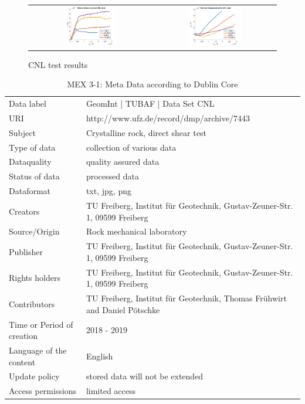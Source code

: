 \begin{figure}[!ht]
\begin{tabular}{cc}
\includegraphics[width=0.45\textwidth]{./figures/CNLShearCurvesAll.png}     
& 
\includegraphics[width=0.45\textwidth]{./figures/CNLDilatationAll.png} 
\end{tabular}
\caption{CNL test results}
\label{fig:DataCNLGraniteLab}
\end{figure}

\begin{table}[!ht]
\caption{MEX 3-1: Meta Data according to Dublin Core}
\label{tab:dms-mex3-1}
\small
\begin{tabular}{R{3cm}|L{7cm}}
\hline
%
Data label & GeomInt | TUBAF | Data Set CNL \\
URI & http://www.ufz.de/record/dmp/archive/7443 \\
Subject  & Crystalline rock, direct shear test \\
Type of data  & collection of various data \\
Dataquality  & quality assured data \\
Status of data  & processed data \\
Dataformat  & txt, jpg, png \\
Creators  & TU Freiberg, Institut für Geotechnik, Gustav-Zeuner-Str. 1, 09599 Freiberg \\
Source/Origin  & Rock mechanical laboratory \\
Publisher  & TU Freiberg, Institut für Geotechnik, Gustav-Zeuner-Str. 1, 09599 Freiberg \\
Rights holders  & TU Freiberg, Institut für Geotechnik, Gustav-Zeuner-Str. 1, 09599 Freiberg \\
Contributors  & TU Freiberg, Institut für Geotechnik, Thomas Fr\"uhwirt and Daniel P\"otschke \\
Time or Period of creation  & 2018 - 2019 \\
Language of the content & English \\
Update policy  & stored data will not be extended \\
Access permissions  & limited access \\
%
\hline
\end{tabular}
\end{table}


